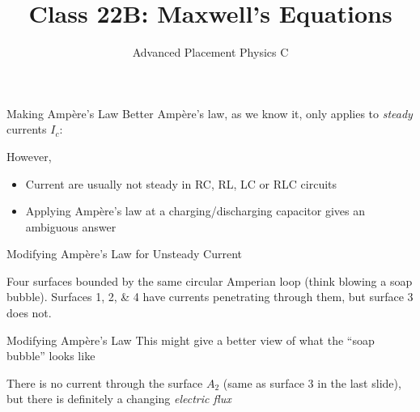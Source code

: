 \documentclass[12pt,aspectratio=169]{beamer}
\title{Class 22B: Maxwell's Equations}
\subtitle{Advanced Placement Physics C}
\begin{document}
\begin{frame}
  \maketitle
\end{frame}


\begin{frame}{Making Amp\`{e}re's Law Better}
  Amp\`{e}re's law, as we know it, only applies to \emph{steady} currents $I_c$:

  However,
  \begin{itemize}
  \item Current are usually not steady in RC, RL, LC or RLC circuits
  \item Applying Amp\`{e}re's law at a charging/discharging capacitor gives an
    ambiguous answer
  \end{itemize}
\end{frame}



\begin{frame}{Modifying Amp\`{e}re's Law for Unsteady Current}
  \begin{center}
  \end{center}
  Four surfaces bounded by the same circular Amperian loop
  (think blowing a soap bubble). Surfaces \numlist{1;2;4} have currents
  penetrating through them, but surface \num{3} does not.
\end{frame}



\begin{frame}{Modifying Amp\`{e}re's Law}
  This might give a better view of what the ``soap bubble'' looks like
  \begin{center}
  \end{center}
  There is no current through the surface $A_2$ (same as surface \num{3} in the
  last slide), but there is definitely a changing \emph{electric flux}
\end{frame}
\end{document}
